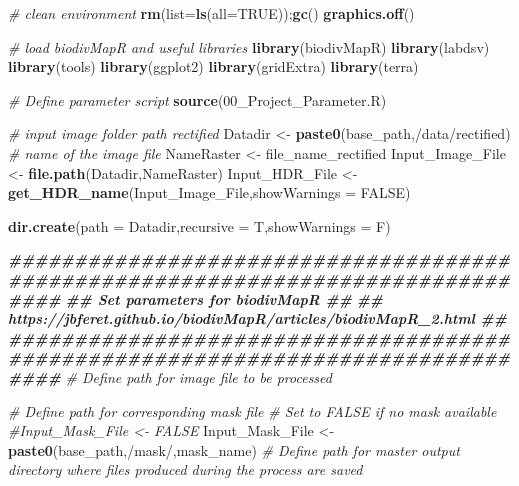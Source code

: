 \documentclass[
]{article}
\newenvironment{Shaded}{\begin{snugshade}}{\end{snugshade}}
\newcommand{\AttributeTok}[1]{\textcolor[rgb]{0.13,0.29,0.53}{#1}}
\newcommand{\CommentTok}[1]{\textcolor[rgb]{0.56,0.35,0.01}{\textit{#1}}}
\newcommand{\ConstantTok}[1]{\textcolor[rgb]{0.56,0.35,0.01}{#1}}
\newcommand{\DocumentationTok}[1]{\textcolor[rgb]{0.56,0.35,0.01}{\textbf{\textit{#1}}}}
\newcommand{\FunctionTok}[1]{\textcolor[rgb]{0.13,0.29,0.53}{\textbf{#1}}}
\newcommand{\NormalTok}[1]{#1}
\newcommand{\OtherTok}[1]{\textcolor[rgb]{0.56,0.35,0.01}{#1}}
\newcommand{\StringTok}[1]{\textcolor[rgb]{0.31,0.60,0.02}{#1}}
\begin{document}
\begin{Shaded}
\begin{Highlighting}[]
\CommentTok{\# clean environment}
\FunctionTok{rm}\NormalTok{(}\AttributeTok{list=}\FunctionTok{ls}\NormalTok{(}\AttributeTok{all=}\ConstantTok{TRUE}\NormalTok{));}\FunctionTok{gc}\NormalTok{()}
\FunctionTok{graphics.off}\NormalTok{()}

\CommentTok{\# load biodivMapR and useful libraries}
\FunctionTok{library}\NormalTok{(biodivMapR)}
\FunctionTok{library}\NormalTok{(labdsv)}
\FunctionTok{library}\NormalTok{(tools)}
\FunctionTok{library}\NormalTok{(ggplot2)}
\FunctionTok{library}\NormalTok{(gridExtra)}
\FunctionTok{library}\NormalTok{(terra)}

\CommentTok{\# Define parameter script}
\FunctionTok{source}\NormalTok{(}\StringTok{\textquotesingle{}00\_Project\_Parameter.R\textquotesingle{}}\NormalTok{)}

\CommentTok{\# input image folder path rectified}
\NormalTok{Datadir }\OtherTok{\textless{}{-}} \FunctionTok{paste0}\NormalTok{(base\_path,}\StringTok{\textquotesingle{}/data/rectified\textquotesingle{}}\NormalTok{)}
\CommentTok{\# name of the image file}
\NormalTok{NameRaster }\OtherTok{\textless{}{-}}\NormalTok{ file\_name\_rectified}
\NormalTok{Input\_Image\_File }\OtherTok{\textless{}{-}} \FunctionTok{file.path}\NormalTok{(Datadir,NameRaster)}
\NormalTok{Input\_HDR\_File }\OtherTok{\textless{}{-}} \FunctionTok{get\_HDR\_name}\NormalTok{(Input\_Image\_File,}\AttributeTok{showWarnings =} \ConstantTok{FALSE}\NormalTok{)}





\FunctionTok{dir.create}\NormalTok{(}\AttributeTok{path =}\NormalTok{ Datadir,}\AttributeTok{recursive =}\NormalTok{ T,}\AttributeTok{showWarnings =}\NormalTok{ F)}

\DocumentationTok{\#\#\#\#\#\#\#\#\#\#\#\#\#\#\#\#\#\#\#\#\#\#\#\#\#\#\#\#\#\#\#\#\#\#\#\#\#\#\#\#\#\#\#\#\#\#\#\#\#\#\#\#\#\#\#\#\#\#\#\#\#\#\#\#\#\#\#\#\#\#\#\#\#\#\#\#\#\#\#\#}
\DocumentationTok{\#\#                      Set parameters for biodivMapR                         \#\#}
\DocumentationTok{\#\# https://jbferet.github.io/biodivMapR/articles/biodivMapR\_2.html            \#\#}
\DocumentationTok{\#\#\#\#\#\#\#\#\#\#\#\#\#\#\#\#\#\#\#\#\#\#\#\#\#\#\#\#\#\#\#\#\#\#\#\#\#\#\#\#\#\#\#\#\#\#\#\#\#\#\#\#\#\#\#\#\#\#\#\#\#\#\#\#\#\#\#\#\#\#\#\#\#\#\#\#\#\#\#\#}
\CommentTok{\# Define path for image file to be processed}

\CommentTok{\# Define path for corresponding mask file}
\CommentTok{\# Set to FALSE if no mask available}
\CommentTok{\#Input\_Mask\_File \textless{}{-} FALSE}
\NormalTok{Input\_Mask\_File }\OtherTok{\textless{}{-}} \FunctionTok{paste0}\NormalTok{(base\_path,}\StringTok{\textquotesingle{}/mask/\textquotesingle{}}\NormalTok{,mask\_name)}
\CommentTok{\# Define path for master output directory where files produced during the process are saved}


\end{Highlighting}
\end{Shaded}
\end{document}
